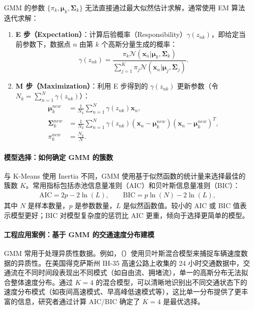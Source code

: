 GMM 的参数 $\{\pi_k, \boldsymbol{\mu}_k, \boldsymbol{\Sigma}_k\}$ 无法直接通过最大似然估计求解，通常使用 EM 算法迭代求解：
\begin{enumerate}
    \item \textbf{E 步（Expectation）}：计算后验概率（Responsibility）$\gamma(z_{nk})$，即给定当前参数下，数据点 $n$ 由第 $k$ 个高斯分量生成的概率：
    \begin{equation}
        \gamma(z_{nk}) = \frac{\pi_k \mathcal{N}(\mathbf{x}_n | \boldsymbol{\mu}_k, \boldsymbol{\Sigma}_k)}{\sum_{j=1}^K \pi_j \mathcal{N}(\mathbf{x}_n | \boldsymbol{\mu}_j, \boldsymbol{\Sigma}_j)}.
    \end{equation}
    \item \textbf{M 步（Maximization）}：利用 E 步得到的 $\gamma(z_{nk})$ 更新参数（令 $N_k = \sum_{n=1}^N \gamma(z_{nk})$）：
    \begin{align*}
        \boldsymbol{\mu}_k^{new} &= \frac{1}{N_k} \sum_{n=1}^N \gamma(z_{nk}) \mathbf{x}_n, \\
        \boldsymbol{\Sigma}_k^{new} &= \frac{1}{N_k} \sum_{n=1}^N \gamma(z_{nk}) (\mathbf{x}_n - \boldsymbol{\mu}_k^{new})(\mathbf{x}_n - \boldsymbol{\mu}_k^{new})^T, \\
        \pi_k^{new} &= \frac{N_k}{N}.
    \end{align*}
\end{enumerate}

\paragraph{模型选择：如何确定 GMM 的簇数}

与 K-Means 使用 Inertia 不同，GMM 使用基于似然函数的统计量来选择最佳的簇数 $K$。常用指标包括赤池信息量准则（AIC）和贝叶斯信息量准则（BIC）：
\begin{align}
    \text{AIC} = 2p - 2\ln(L), \qquad \text{BIC} = p\ln(N) - 2\ln(L),
\end{align}
其中 $N$ 是样本数量，$p$ 是参数数量，$L$ 是似然函数值。较小的 AIC 或 BIC 值表示模型更好；BIC 对模型复杂度的惩罚比 AIC 更重，倾向于选择更简单的模型。

\paragraph{工程应用案例：基于 GMM 的交通速度分布建模}

GMM 常用于处理异质性数据。例如，\citet{park2010mixture}（\citep{park2010mixture}）使用贝叶斯混合模型来捕捉车辆速度数据的异质性。在美国得克萨斯州 IH-35 高速公路上收集的 24 小时交通数据中，交通流在不同时间段表现出不同模式（如自由流、拥堵流），单一的高斯分布无法拟合整体速度分布。通过 $K=4$ 的混合模型，可以清晰地识别出不同交通状态下的速度分布模式（如夜间高速模式、早高峰低速模式等），这比单一分布提供了更丰富的信息，研究者通过计算 AIC/BIC 确定了 $K=4$ 是最优选择。

